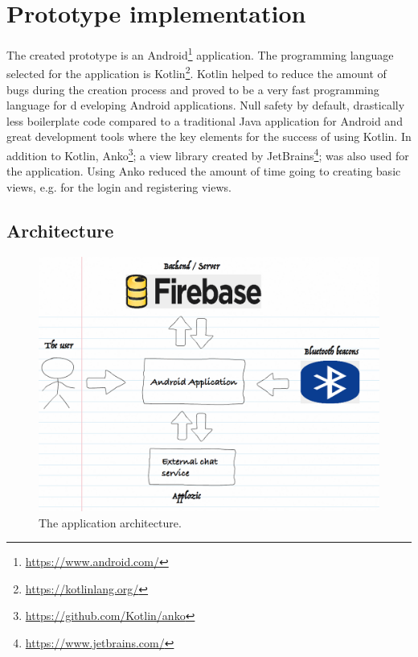 \section{Prototype implementation}

The created prototype is an Android\footnote{\url{https://www.android.com/}} application. The programming language selected for the application is Kotlin\footnote{\url{https://kotlinlang.org/}}. Kotlin helped to reduce the amount of bugs during the creation process and proved to be a very fast programming language for d	eveloping Android applications. Null safety by default, drastically less boilerplate code compared to a traditional Java application for Android and great development tools where the key elements for the success of using Kotlin. In addition to Kotlin, Anko\footnote{\url{https://github.com/Kotlin/anko}}; a view library created by JetBrains\footnote{\url{https://www.jetbrains.com/}}; was also used for the application. Using Anko reduced the amount of time going to creating basic views, e.g. for the login and registering views.

\subsection{Architecture}

\begin{figure}[htb]
	\begin{center}
		\includegraphics[width=1\textwidth]{fs_architecture.png}
		\caption{The application architecture.}	
	\end{center}
\end{figure}

